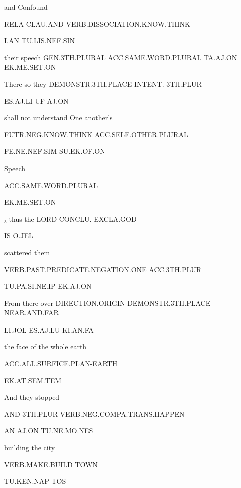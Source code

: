  

and  			Confound 

RELA-CLAU.AND	VERB.DISSOCIATION.KNOW.THINK 

I.AN			TU.LIS.NEF.SIN      

  

their 			speech				GEN.3TH.PLURAL             ACC.SAME.WORD.PLURAL	 	TA.AJ.ON		EK.ME.SET.ON 

  

There			so 			they 		DEMONSTR.3TH.PLACE        INTENT.		3TH.PLUR	 

ES.AJ.LI				UF		AJ.ON				 

shall not understand 		One another’s 

FUTR.NEG.KNOW.THINK		ACC.SELF.OTHER.PLURAL 

FE.NE.NEF.SIM			SU.EK.OF.ON	 

  

Speech 

ACC.SAME.WORD.PLURAL 

EK.ME.SET.ON 

 

₈ thus 		the LORD 					CONCLU.	EXCLA.GOD					 

IS		O.JEL		 

 

scattered				them 

VERB.PAST.PREDICATE.NEGATION.ONE	ACC.3TH.PLUR 

TU.PA.SI.NE.IP				EK.AJ.ON 

 

From 			there 			over 		DIRECTION.ORIGIN         DEMONSTR.3TH.PLACE  NEAR.AND.FAR 

LI.JOL			ES.AJ.LU		KI.AN.FA	 

 

 

the face of the whole earth 

ACC.ALL.SURFICE.PLAN-EARTH 

EK.AT.SEM.TEM 

 

And 	they 		stopped 				 

AND	3TH.PLUR	VERB.NEG.COMPA.TRANS.HAPPEN	 

AN	AJ.ON		TU.NE.MO.NES		                               

 

building 		the city 

VERB.MAKE.BUILD	TOWN 

TU.KEN.NAP                      TOS 

